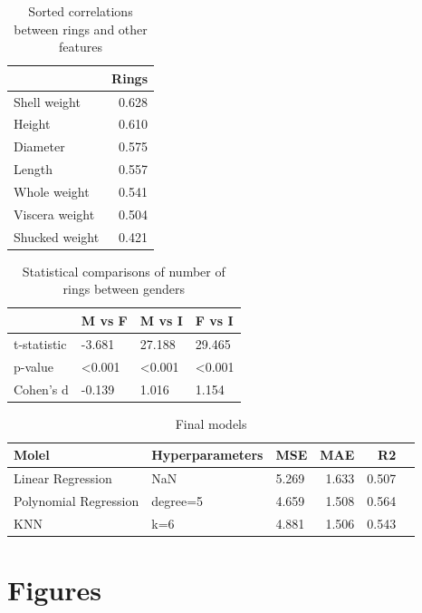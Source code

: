 \documentclass[twocolumn]{article}
\begin{document}
\begin{table}[H]
    \centering
    \caption{Sorted correlations between rings and other features}
    \label{tab:correlations}
    \begin{tabular}{lr}
    \toprule
     & Rings \\
    \midrule
 Shell weight & 0.628 \\
 Height & 0.610 \\
 Diameter & 0.575 \\
 Length & 0.557 \\
 Whole weight & 0.541 \\
 Viscera weight & 0.504 \\
 Shucked weight & 0.421 \\
    \bottomrule
    \end{tabular}
\end{table}
    

\vfill

\begin{table}[H]
    \centering
    \caption{Statistical comparisons of number of rings between genders}
    \label{tab:gender_comparisons}
    \begin{tabular}{llll}
        \toprule
        & M vs F & M vs I & F vs I \\
        \midrule
 t-statistic & -3.681 & 27.188 & 29.465 \\
 p-value & \textless{}0.001 & \textless{}0.001 & \textless{}0.001 \\
 Cohen's d & -0.139 & 1.016 & 1.154 \\
        \bottomrule
    \end{tabular}
\end{table}

\vfill

\begin{table}[H]
    \center
    \caption{Final models}
    \label{tab:model_comparisons}
    \begin{tabular}{lllrrr}
    \toprule
 Molel & Hyperparameters & MSE & MAE & R2 \\
    \midrule
 Linear Regression & NaN & 5.269 & 1.633 & 0.507 \\
 Polynomial Regression & degree=5 & 4.659 & 1.508 & 0.564 \\
 KNN & k=6 & 4.881 & 1.506 & 0.543 \\
    \bottomrule
    \end{tabular}
\end{table}

\newpage
\section{Figures}
\renewcommand{\thefigure}{A.\arabic{figure}}
\setcounter{figure}{0}
\end{document}
